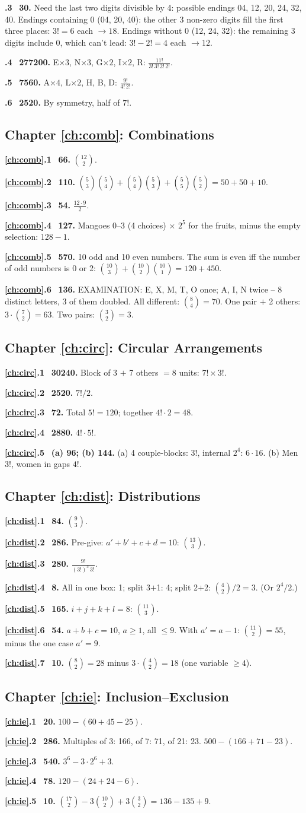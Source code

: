 \documentclass[11pt,a4paper,openany]{report}
\newcommand{\C}[2]{\binom{#1}{#2}}
\newcommand{\solchapter}[2]{\subsection*{Chapter \ref*{#1}: #2}\def\solprefix{\ref*{#1}}}
\newcommand{\sol}[1]{\par\smallskip\textbf{\solprefix.#1}\ }
\begin{document}
\sol{3} \textbf{30.} Need the last two digits divisible by 4: possible endings 04, 12, 20, 24, 32, 40.
Endings containing 0 (04, 20, 40): the other 3 non-zero digits fill the first three places: $3!=6$ each $\to18$.
Endings without 0 (12, 24, 32): the remaining 3 digits include 0, which can't lead: $3!-2!=4$ each $\to12$.

\sol{4} \textbf{277200.} E$\times3$, N$\times3$, G$\times2$, I$\times2$, R: $\frac{11!}{3!\,3!\,2!\,2!}$.

\sol{5} \textbf{7560.} A$\times4$, L$\times2$, H, B, D: $\frac{9!}{4!\,2!}$.

\sol{6} \textbf{2520.} By symmetry, half of $7!$.

\solchapter{ch:comb}{Combinations}
\sol{1} \textbf{66.} $\C{12}2$.

\sol{2} \textbf{110.} $\C53\C54+\C54\C53+\C55\C52=50+50+10$.

\sol{3} \textbf{54.} $\frac{12\cdot9}{2}$.

\sol{4} \textbf{127.} Mangoes 0--3 (4 choices) $\times$ $2^5$ for the fruits, minus the empty selection: $128-1$.

\sol{5} \textbf{570.} 10 odd and 10 even numbers. The sum is even iff the number of odd numbers is 0 or 2: $\C{10}3+\C{10}2\C{10}1=120+450$.

\sol{6} \textbf{136.} EXAMINATION: E, X, M, T, O once; A, I, N twice -- 8 distinct letters, 3 of them doubled.
All different: $\C84=70$. One pair $+$ 2 others: $3\cdot\C72=63$. Two pairs: $\C32=3$.

\solchapter{ch:circ}{Circular Arrangements}
\sol{1} \textbf{30240.} Block of 3 $+$ 7 others $=8$ units: $7!\times3!$.
\sol{2} \textbf{2520.} $7!/2$.
\sol{3} \textbf{72.} Total $5!=120$; together $4!\cdot2=48$.
\sol{4} \textbf{2880.} $4!\cdot5!$.
\sol{5} \textbf{(a) 96; (b) 144.} (a) 4 couple-blocks: $3!$, internal $2^4$: $6\cdot16$. (b) Men $3!$, women in gaps $4!$.

\solchapter{ch:dist}{Distributions}
\sol{1} \textbf{84.} $\C93$.
\sol{2} \textbf{286.} Pre-give: $a'+b'+c+d=10$: $\C{13}3$.
\sol{3} \textbf{280.} $\frac{9!}{(3!)^3\,3!}$.
\sol{4} \textbf{8.} All in one box: 1; split 3$+$1: 4; split 2$+$2: $\C42/2=3$. (Or $2^4/2$.)
\sol{5} \textbf{165.} $i+j+k+l=8$: $\C{11}3$.
\sol{6} \textbf{54.} $a+b+c=10$, $a\ge1$, all $\le9$. With $a'=a-1$: $\C{11}2=55$, minus the one case $a'=9$.
\sol{7} \textbf{10.} $\C82=28$ minus $3\cdot\C42=18$ (one variable $\ge4$).

\solchapter{ch:ie}{Inclusion--Exclusion}
\sol{1} \textbf{20.} $100-(60+45-25)$.
\sol{2} \textbf{286.} Multiples of 3: 166, of 7: 71, of 21: 23. $500-(166+71-23)$.
\sol{3} \textbf{540.} $3^6-3\cdot2^6+3$.
\sol{4} \textbf{78.} $120-(24+24-6)$.
\sol{5} \textbf{10.} $\C{17}2-3\C{10}2+3\C32=136-135+9$.
\end{document}
